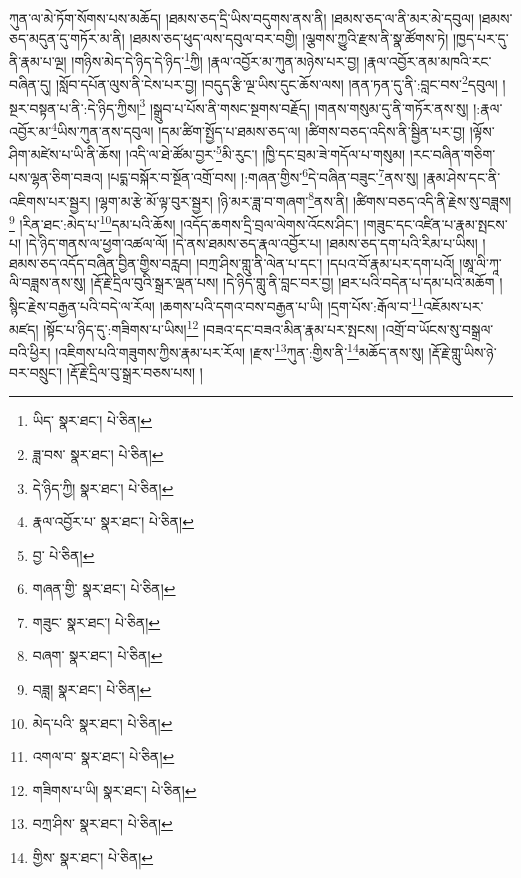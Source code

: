 ཀུན་ལ་མེ་ཏོག་སོགས་པས་མཆོད། །ཐམས་ཅད་དྲི་ཡིས་བདུགས་ནས་ནི། །ཐམས་ཅད་ལ་ནི་མར་མེ་དབུལ། །ཐམས་ཅད་མདུན་དུ་གཏོར་མ་ནི། །ཐམས་ཅད་ཕུད་ལས་དབུལ་བར་བགྱི། །ལྕགས་ཀྱུའི་རྫས་ནི་སྣ་ཚོགས་ཏེ། །ཁྱད་པར་དུ་ནི་རྣམ་པ་ལྔ། །གཉིས་མེད་དེ་ཉིད་དེ་ཉིད་\footnote{ཡིད་  སྣར་ཐང་།  པེ་ཅིན། }ཀྱི། །རྣལ་འབྱོར་མ་ཀུན་མཉེས་པར་བྱ། །རྣལ་འབྱོར་ནམ་མཁའི་རང་བཞིན་དུ། །སློབ་དཔོན་ལུས་ནི་ངེས་པར་བྱ། །བདུད་རྩི་ལྔ་ཡིས་དུང་ཆོས་ལས། །ནན་ཏན་དུ་ནི་:བླང་བས་\footnote{ཟླ་བས་  སྣར་ཐང་།  པེ་ཅིན། }དབུལ། །སྔར་བསྟན་པ་ནི་:དེ་ཉིད་ཀྱིས།\footnote{དེ་ཉིད་ཀྱི།  སྣར་ཐང་།  པེ་ཅིན། } །སྒྲུབ་པ་པོས་ནི་གསང་སྔགས་བརྗོད། །གནས་གསུམ་དུ་ནི་གཏོར་ནས་སུ། །:རྣལ་འབྱོར་མ་\footnote{རྣལ་འབྱོར་པ་  སྣར་ཐང་།  པེ་ཅིན། }ཡིས་ཀུན་ནས་དབུལ། །དམ་ཚིག་སྤྱོད་པ་ཐམས་ཅད་ལ། །ཚིགས་བཅད་འདིས་ནི་སྦྱིན་པར་བྱ། །ལྟོས་ཤིག་མཛེས་པ་ཡི་ནི་ཆོས། །འདི་ལ་ཐེ་ཚོམ་བྱར་\footnote{བྱ་  པེ་ཅིན། }མི་རུང་། །ཁྱི་དང་བྲམ་ཟེ་གདོལ་པ་གསུམ། །རང་བཞིན་གཅིག་པས་ལྷན་ཅིག་བཟའ། །པདྨ་བསྐོར་བ་སྔོན་འགྲོ་བས། །:གཞན་གྱིས་\footnote{གཞན་གྱི་  སྣར་ཐང་།  པེ་ཅིན། }དེ་བཞིན་བཟུང་\footnote{གཟུང་  སྣར་ཐང་།  པེ་ཅིན། }ནས་སུ། །རྣམ་ཤེས་དང་ནི་འཇིགས་པར་སྦྱར། །ལྷག་མ་རྩེ་མོ་ལྟ་བུར་སྦྱར། །ཉི་མར་ཟླ་བ་གཞག་\footnote{བཞག་  སྣར་ཐང་།  པེ་ཅིན། }ནས་ནི། །ཚིགས་བཅད་འདི་ནི་རྗེས་སུ་བཟླས།\footnote{བཟླ།  སྣར་ཐང་།  པེ་ཅིན། } །རིན་ཐང་:མེད་པ་\footnote{མེད་པའི་  སྣར་ཐང་།  པེ་ཅིན། }དམ་པའི་ཆོས། །འདོད་ཆགས་དྲི་བྲལ་ལེགས་འོངས་ཤིང་། །གཟུང་དང་འཛིན་པ་རྣམ་སྤངས་པ། །དེ་ཉིད་གནས་ལ་ཕྱག་འཚལ་ལོ། །དེ་ནས་ཐམས་ཅད་རྣལ་འབྱོར་པ། །ཐམས་ཅད་དག་པའི་རིམ་པ་ཡིས། །ཐམས་ཅད་འདོད་བཞིན་བྱིན་གྱིས་བརླབ། །བཀྲ་ཤིས་གླུ་ནི་ལེན་པ་དང་། །དཔའ་བོ་རྣམ་པར་དག་པའོ། །ཨཱ་ལི་ཀཱ་ལི་བཟླས་ནས་སུ། །རྡོ་རྗེ་དྲིལ་བུའི་སྒྲར་ལྡན་པས། །དེ་ཉིད་གླུ་ནི་བླང་བར་བྱ། །ཐར་པའི་བདེན་པ་དམ་པའི་མཆོག །སྙིང་རྗེས་བརྒྱན་པའི་བདེ་ལ་རོལ། །ཆགས་པའི་དགའ་བས་བརྒྱན་པ་ཡི། །དྲག་པོས་:རྒོལ་བ་\footnote{འགལ་བ་  སྣར་ཐང་།  པེ་ཅིན། }འཇོམས་པར་མཛད། །སྟོང་པ་ཉིད་དུ་:གཟིགས་པ་ཡིས།\footnote{གཟིགས་པ་ཡི།  སྣར་ཐང་།  པེ་ཅིན། } །བཟའ་དང་བཟའ་མིན་རྣམ་པར་སྤངས། །འགྲོ་བ་ཡོངས་སུ་བསྒྲལ་བའི་ཕྱིར། །འཇིགས་པའི་གཟུགས་ཀྱིས་རྣམ་པར་རོལ། །རྫས་\footnote{བཀྲ་ཤིས་  སྣར་ཐང་།  པེ་ཅིན། }ཀུན་:གྱིས་ནི་\footnote{གྱིས་  སྣར་ཐང་།  པེ་ཅིན། }མཆོད་ནས་སུ། །རྡོ་རྗེ་གླུ་ཡིས་ཉེ་བར་བསྲུང་། །རྡོ་རྗེ་དྲིལ་བུ་སྒྲར་བཅས་པས། །
